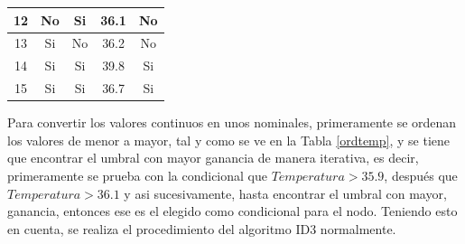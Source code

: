 \documentclass[twoside,spanish,ESP,MSc]{plantillaLabUPV}
\theoremstyle{definition}
\begin{document}
\begin{table}[!tbh]
\begin{tabular}{|c|c|c|c|c|}
		12          & No           & Si                                                                     & 36.1              & No             \\ \hline
		13          & Si           & No                                                                     & 36.2              & No             \\ \hline
		14          & Si           & Si                                                                     & 39.8              & Si             \\ \hline
		15          & Si           & Si                                                                     & 36.7              & Si             \\ \hline
	\end{tabular}
\end{table}

Para convertir los valores continuos en unos nominales, primeramente se ordenan los valores de menor a mayor, tal y como se ve en la Tabla \ref{ordtemp}, y se tiene que encontrar el umbral con mayor ganancia de manera iterativa, es decir, primeramente se prueba con la condicional que $Temperatura > 35.9$, después que $Temperatura > 36.1$ y asi sucesivamente, hasta encontrar el umbral con mayor, ganancia, entonces ese es el elegido como condicional para el nodo. Teniendo esto en cuenta, se realiza el procedimiento del algoritmo ID3 normalmente.
\end{document}
